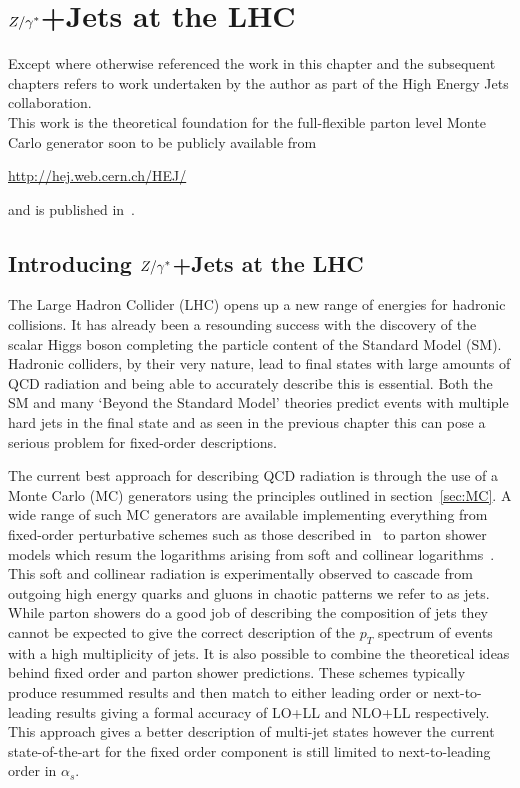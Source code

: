 
\chapter{$Z/\gamma^*$+Jets at the LHC}
\label{chap:Zs}

	Except where otherwise referenced the work in this chapter and the subsequent chapters refers to
	work undertaken by the author as part of the High Energy Jets collaboration.\\This work is the theoretical foundation for the
	full-flexible parton level Monte Carlo generator soon to be publicly available from

	\begin{center}
		\url{http://hej.web.cern.ch/HEJ/}
	\end{center}

	and is published in~\cite{ZPaper}.

\section{Introducing $Z/\gamma^*$+Jets at the LHC}

	The Large Hadron Collider (LHC) opens up a new range of energies for hadronic
	collisions.  It has already been a resounding success with the discovery of the
	scalar Higgs boson completing the particle content of the Standard Model (SM).
	Hadronic colliders, by their very nature, lead to final states with large
	amounts of QCD radiation and being able to accurately describe this is
	essential.  Both the SM and many `Beyond the Standard Model' theories
	predict events with multiple hard jets in the final state and as seen in the
	previous chapter this can pose a serious problem for fixed-order descriptions.

	The current best approach for describing QCD radiation is through the use of
	a Monte Carlo (MC) generators using the principles outlined in section~\ref{sec:MC}.
	A wide range of such MC generators are available implementing everything from
	fixed-order perturbative schemes such as those described in~\cite{Mangano:2002ea,Badger:2012pg} to parton
	shower models which resum the logarithms arising from soft and collinear logarithms~\cite{Gleisberg:2008ta,Sjostrand:2007gs,Corcella:2000bw}.
	This soft and collinear radiation is experimentally observed to cascade from outgoing
	high energy quarks and gluons in chaotic patterns we refer to as jets.  While parton
	showers do a good job of describing the composition of jets they cannot be expected to give the correct
	description of the $p_T$ spectrum of events with a high multiplicity of jets.
	It is also possible to combine the
	theoretical ideas behind fixed order and parton shower predictions.  These schemes typically
	produce resummed results and then match to either leading order or next-to-leading
	results giving a formal accuracy of LO+LL and NLO+LL respectively.  This approach gives a
	better description of multi-jet states however the current state-of-the-art for the
	fixed order component is still limited to next-to-leading order in $\alpha_s$.


